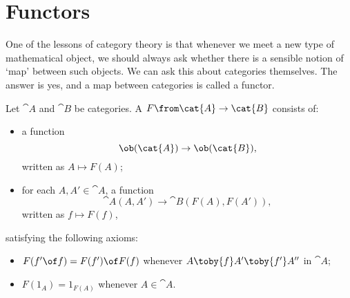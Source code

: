 \section{Functors}
\label{sec:ftrs}


One of the lessons of category theory is that whenever we meet a new type
of mathematical object, we should always ask whether there is a sensible
notion of `map' between such objects.  We can ask this about categories
themselves.  The answer is yes, and a map between categories is called a
functor.

\begin{defn}
Let $\cat{A}$ and $\cat{B}$ be categories.  A %
%
%
$F\from \cat{A} \to \cat{B}$ consists of:
% 
\begin{itemize}
\item 
a function
\[
\ob(\cat{A}) \to \ob(\cat{B}),
\]
written as $A \mapsto F(A)$;

\item 
for each $A, A' \in \cat{A}$, a function
\[
\cat{A}(A, A') \to \cat{B}(F(A), F(A')),
\]
written as $f \mapsto F(f)$,
\end{itemize}
% 
satisfying the following axioms:
% 
\begin{itemize}
\item 
$F(f' \of f) = F(f') \of F(f)$ whenever $A \toby{f} A' \toby{f'} A''$ in
$\cat{A}$;

\item 
$F(1_A) = 1_{F(A)}$ whenever $A \in \cat{A}$.
\end{itemize}
\end{defn}

